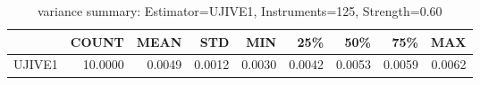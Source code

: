 \begin{table}[ht]
\centering
\caption{variance summary: Estimator=UJIVE1, Instruments=125, Strength=0.60}
\begin{tabular}{lrrrrrrrr}
\toprule
 & COUNT & MEAN & STD & MIN & 25\% & 50\% & 75\% & MAX \\
\midrule
UJIVE1 & 10.0000 & 0.0049 & 0.0012 & 0.0030 & 0.0042 & 0.0053 & 0.0059 & 0.0062 \\
\bottomrule
\end{tabular}
\end{table}
